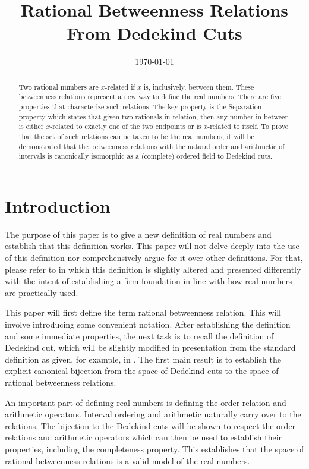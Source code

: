 \documentclass[12pt]{article}
\title{Rational Betweenness Relations From Dedekind Cuts}
\date{\today}
\begin{document}
\maketitle
\begin{abstract}
Two rational numbers are $x$-related if $x$ is, inclusively, between them. These betweenness relations represent a new way to define the real numbers. There are five properties that characterize such relations. The key property is the Separation property which states that given two rationals in relation, then any number in between is either $x$-related to exactly one of the two endpoints or is $x$-related to itself. To prove that the set of such relations can be taken to be the real numbers, it will be demonstrated that the betweenness relations with the natural order and arithmetic of intervals is canonically isomorphic as a (complete) ordered field to Dedekind cuts. 
\end{abstract}

\section{Introduction}

The purpose of this paper is to give a new definition of real numbers and establish that this definition works. This paper will not delve deeply into the use of this definition nor comprehensively argue for it over other definitions. For that, please refer to \cite{taylor23main} in which this definition is slightly altered and presented differently with the intent of establishing a firm foundation in line with how real numbers are practically used.

This paper will first define the term rational betweenness relation. This will involve introducing some convenient notation. After establishing the definition and some immediate properties, the next task is to recall the definition of Dedekind cut, which will be slightly modified in presentation from the standard definition as given, for example, in \cite{rudin}. The first main result is to establish the explicit canonical bijection from the space of Dedekind cuts to the space of rational betweenness relations. 

An important part of defining real numbers is defining the order relation and arithmetic operators. Interval ordering and arithmetic naturally carry over to the relations. The bijection to the Dedekind cuts will be shown to respect the order relations and arithmetic operators which can then be used to establish their properties, including the completeness property.   This establishes that the space of rational betweenness relations is a valid model of the real numbers. 
\end{document}

